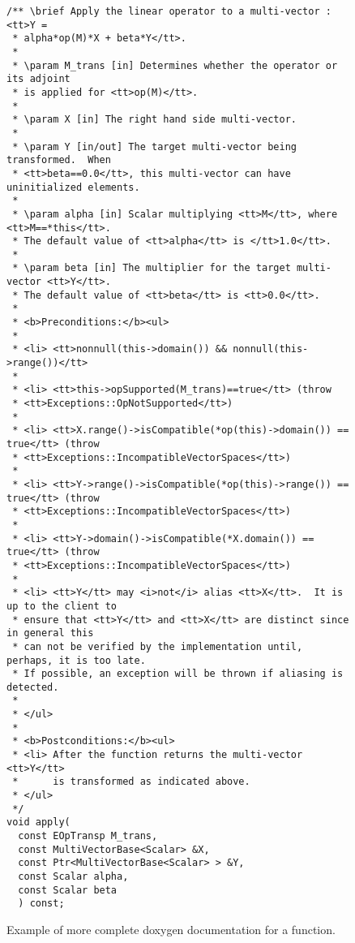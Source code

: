 \begin{figure}
%
{\small\begin{verbatim}
/** \brief Apply the linear operator to a multi-vector : <tt>Y =
 * alpha*op(M)*X + beta*Y</tt>.
 *
 * \param M_trans [in] Determines whether the operator or its adjoint 
 * is applied for <tt>op(M)</tt>.
 *
 * \param X [in] The right hand side multi-vector.
 *
 * \param Y [in/out] The target multi-vector being transformed.  When
 * <tt>beta==0.0</tt>, this multi-vector can have uninitialized elements.
 *
 * \param alpha [in] Scalar multiplying <tt>M</tt>, where <tt>M==*this</tt>.
 * The default value of <tt>alpha</tt> is </tt>1.0</tt>.
 *
 * \param beta [in] The multiplier for the target multi-vector <tt>Y</tt>.
 * The default value of <tt>beta</tt> is <tt>0.0</tt>.
 * 
 * <b>Preconditions:</b><ul>
 *
 * <li> <tt>nonnull(this->domain()) && nonnull(this->range())</tt>
 *
 * <li> <tt>this->opSupported(M_trans)==true</tt> (throw
 * <tt>Exceptions::OpNotSupported</tt>)
 *
 * <li> <tt>X.range()->isCompatible(*op(this)->domain()) == true</tt> (throw
 * <tt>Exceptions::IncompatibleVectorSpaces</tt>)
 *
 * <li> <tt>Y->range()->isCompatible(*op(this)->range()) == true</tt> (throw
 * <tt>Exceptions::IncompatibleVectorSpaces</tt>)
 *
 * <li> <tt>Y->domain()->isCompatible(*X.domain()) == true</tt> (throw
 * <tt>Exceptions::IncompatibleVectorSpaces</tt>)
 *
 * <li> <tt>Y</tt> may <i>not</i> alias <tt>X</tt>.  It is up to the client to
 * ensure that <tt>Y</tt> and <tt>X</tt> are distinct since in general this
 * can not be verified by the implementation until, perhaps, it is too late.
 * If possible, an exception will be thrown if aliasing is detected.
 *
 * </ul>
 *
 * <b>Postconditions:</b><ul>
 * <li> After the function returns the multi-vector <tt>Y</tt>
 *      is transformed as indicated above.
 * </ul>
 */
void apply(
  const EOpTransp M_trans,
  const MultiVectorBase<Scalar> &X,
  const Ptr<MultiVectorBase<Scalar> > &Y,
  const Scalar alpha,
  const Scalar beta
  ) const;
\end{verbatim}}
%
\caption{\label{fig:complete_func_doc}
Example of more complete doxygen documentation for a function.}
%
\end{figure}


